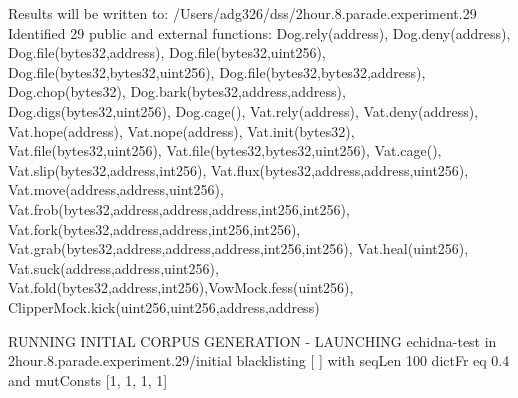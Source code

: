 \documentclass[sigconf]{acmart}
\begin{document}
{\begin{figure*}
{\begin{code}
Results will be written to: /Users/adg326/dss/2hour.8.parade.experiment.29
Identified 29 public and external functions: Dog.rely(address), Dog.deny(address), Dog.file(bytes32,address), Dog.file(bytes32,uint256),
  Dog.file(bytes32,bytes32,uint256), Dog.file(bytes32,bytes32,address), Dog.chop(bytes32), Dog.bark(bytes32,address,address), Dog.digs(bytes32,uint256),
   Dog.cage(), Vat.rely(address), Vat.deny(address), Vat.hope(address), Vat.nope(address), Vat.init(bytes32), Vat.file(bytes32,uint256), Vat.file(bytes32,bytes32,uint256),
  Vat.cage(), Vat.slip(bytes32,address,int256), Vat.flux(bytes32,address,address,uint256), Vat.move(address,address,uint256),
   Vat.frob(bytes32,address,address,address,int256,int256), Vat.fork(bytes32,address,address,int256,int256), Vat.grab(bytes32,address,address,address,int256,int256),
  Vat.heal(uint256), Vat.suck(address,address,uint256), Vat.fold(bytes32,address,int256),VowMock.fess(uint256), ClipperMock.kick(uint256,uint256,address,address)

\vspace{0.1in}
  
RUNNING INITIAL CORPUS GENERATION
- LAUNCHING echidna-test in 2hour.8.parade.experiment.29/initial blacklisting [  ] with seqLen 100 dictFr
eq 0.4 and mutConsts  [1, 1, 1, 1]

\vspace{0.1in}


\end{code}}
\end{figure*}}
\end{document}
